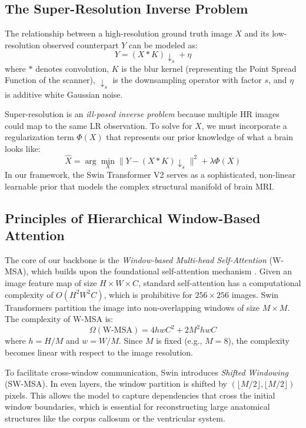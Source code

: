 \documentclass{IEEEoj}
\begin{document}
\subsection{The Super-Resolution Inverse Problem}
The relationship between a high-resolution ground truth image $X$ and its low-resolution observed counterpart $Y$ can be modeled as:
\begin{equation}
    Y = (X \ast K) \downarrow_s + \eta
\end{equation}
where $\ast$ denotes convolution, $K$ is the blur kernel (representing the Point Spread Function of the scanner), $\downarrow_s$ is the downsampling operator with factor $s$, and $\eta$ is additive white Gaussian noise.

Super-resolution is an \textit{ill-posed inverse problem} because multiple HR images could map to the same LR observation. To solve for $X$, we must incorporate a regularization term $\Phi(X)$ that represents our prior knowledge of what a brain looks like:
\begin{equation}
    \hat{X} = \arg \min_X \|Y - (X \ast K) \downarrow_s \|^2 + \lambda \Phi(X)
\end{equation}
In our framework, the Swin Transformer V2 serves as a sophisticated, non-linear learnable prior that models the complex structural manifold of brain MRI.

\subsection{Principles of Hierarchical Window-Based Attention}
The core of our backbone is the \textit{Window-based Multi-head Self-Attention} (W-MSA), which builds upon the foundational self-attention mechanism \cite{attention}. Given an image feature map of size $H \times W \times C$, standard self-attention has a computational complexity of $O(H^2 W^2 C)$, which is prohibitive for $256 \times 256$ images. Swin Transformers partition the image into non-overlapping windows of size $M \times M$. The complexity of W-MSA is:
\begin{equation}
    \Omega(\text{W-MSA}) = 4hwC^2 + 2M^2hwC
\end{equation}
where $h=H/M$ and $w=W/M$. Since $M$ is fixed (e.g., $M=8$), the complexity becomes linear with respect to the image resolution.

To facilitate cross-window communication, Swin introduces \textit{Shifted Windowing} (SW-MSA). In even layers, the window partition is shifted by $(\lfloor M/2 \rfloor, \lfloor M/2 \rfloor)$ pixels. This allows the model to capture dependencies that cross the initial window boundaries, which is essential for reconstructing large anatomical structures like the corpus callosum or the ventricular system.
\end{document}
